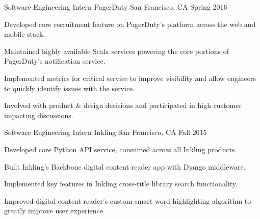 

\begin{cventries}

  \cventry
    {Software Engineering Intern} %
    {PagerDuty} %
    {San Francisco, CA} %
    {Spring 2016} %
    {
      \begin{cvitems} %
      \item {Developed core recruitment feature on PagerDuty's platform across the web and mobile stack.}
      \item {Maintained highly available Scala services powering the core portions of PagerDuty's notification service.}
      \item {Implemented metrics for critical service to improve visibility and allow engineers to quickly identify issues with the service. }
      \item {Involved with product \& design decisions and participated in high customer impacting discussions. }
      \end{cvitems}
    }

  \cventry
    {Software Engineering Intern} %
    {Inkling} %
    {San Francisco, CA} %
    {Fall 2015} %
    {
      \begin{cvitems} %
      \item {Developed core Python API service, consumed across all Inkling products.}
      \item {Built Inkling's Backbone digital content reader app with Django middleware.}
      \item {Implemented key features in Inkling cross-title library search functionality.}
      \item {Improved digital content reader's custom smart word-highlighting algorithm to greatly improve user experience.}
      \end{cvitems}
    }


\end{cventries}
